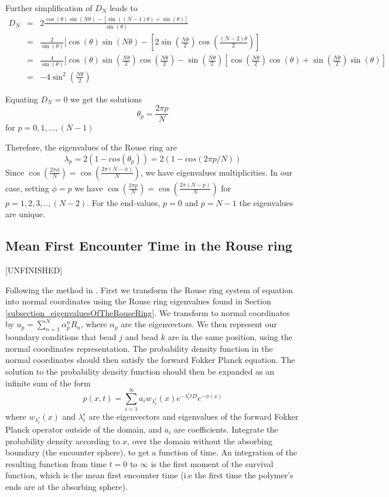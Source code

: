 \documentclass{report}
\begin{document}
Further simplification of $D_N$ leads to 
\begin{eqnarray*}
D_N &=& 2\frac{\cos(\theta)\sin(N\theta)-[\sin((N-1)\theta)+\sin(\theta)]}{\sin(\theta)}\\
    &=& \frac{2}{\sin(\theta)}[\cos(\theta)\sin(N\theta)-[2\sin(\frac{N\theta}{2})\cos(\frac{(N-2)\theta}{2})]\\
    &=& \frac{4}{\sin(\theta)}[\cos(\theta)\sin(\frac{N\theta}{2})\cos(\frac{N\theta}{2})-\sin(\frac{N\theta}{2})[\cos(\frac{N\theta}{2})\cos(\theta)+\sin(\frac{N\theta}{2})\sin(\theta)]\\
    &=& -4\sin^2(\frac{N\theta}{2})
\end{eqnarray*}

Equating $D_N=0$ we get the solutions
\begin{equation*}
\theta_p=\frac{2\pi p}{N}
\end{equation*}
for $p=0,1,...,(N-1)$

Therefore, the eigenvalues of the Rouse ring are 
\begin{equation*}
\lambda_p=2(1-cos(\theta_p))= 2(1-cos(2\pi p/N))
\end{equation*}
Since $\cos(\frac{2\pi \phi}{N})=\cos(\frac{2\pi(N-\phi)}{N})$, we have eigenvalues multiplicities. In our case, setting $\phi=p$ we have $\cos(\frac{2\pi p}{N})=\cos(\frac{2\pi(N-p)}{N})$ for $p=1,2,3,..,(N-2)$. For the end-values, $p=0$ and $p=N-1$ the eigenvalues are unique. 

\subsection{Mean First Encounter Time in the Rouse ring}\label{subsection_meanFirstEncounterTimeInTheRouseRing}
[UNFINISHED]

Following the method in \cite{amitai2012computation}. First we transform the Rouse ring system of equation into normal coordinates using the Rouse ring eigenvalues found in Section \ref{subsection_eigenvaluesOfTheRouseRing}. We transform to normal coordinates by $u_p=\sum_{n=1}^N \alpha_p^nR_n$, where $\alpha_p$ are the eigenvectors. We then represent our boundary conditions that bead $j$ and bead $k$ are in the same position, using the normal coordinates representation. The probability density function in the normal coordinates should then satisfy the forward Fokker Planck equation. The solution to the probability density function should then be expanded as an infinite sum of the form 
\begin{equation*}
p(x,t)=\sum_{i=1}^\infty a_iw_{\lambda_i^\epsilon}(x)e^{-\lambda_i^\epsilon tD}e^{-\phi(x)}
\end{equation*}
where $w_{\lambda_i^\epsilon}(x)$ and $\lambda_i^\epsilon$ are the eigenvectors and eigenvalues of the forward Fokker Planck operator outside of the domain, and $a_i$ are coefficients. Integrate the probability density according to $x$, over the domain without the absorbing boundary (the encounter sphere), to get a function of time. An integration of the resulting function from time $t=0$ to $\infty$ is the first moment of the survival function, which is the mean first encounter time (i.e the first time the polymer's ends are at the absorbing sphere). 
\end{document}

